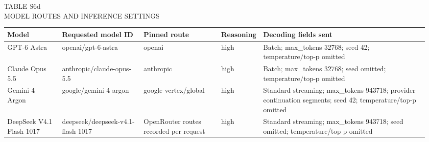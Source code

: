 \begin{table}[t]
\centering
\begingroup
\fontsize{10}{12}\selectfont
TABLE S6d\\
MODEL ROUTES AND INFERENCE SETTINGS\par\smallskip
\setlength{\tabcolsep}{4pt}
\renewcommand{\arraystretch}{1.15}
\begin{tabularx}{\linewidth}{@{}>{\hsize=0.85\hsize\raggedright\arraybackslash}X>{\hsize=1.2\hsize\raggedright\arraybackslash}X>{\hsize=0.9\hsize\raggedright\arraybackslash}X>{\hsize=0.6\hsize\raggedright\arraybackslash}X>{\hsize=1.45\hsize\raggedright\arraybackslash}X@{}}
\toprule
\textbf{Model} & \textbf{Requested model ID} & \textbf{Pinned route} & \textbf{Reasoning} & \textbf{Decoding fields sent} \\
\midrule
GPT-6 Astra & openai/gpt-6-astra & openai & high & Batch; max\_tokens 32768; seed 42; temperature/top-p omitted \\
Claude Opus 5.5 & anthropic/claude-opus-5.5 & anthropic & high & Batch; max\_tokens 32768; seed omitted; temperature/top-p omitted \\
Gemini 4 Argon & google/gemini-4-argon & google-vertex/global & high & Standard streaming; max\_tokens 943718; provider continuation segments; seed 42; temperature/top-p omitted \\
DeepSeek V4.1 Flash 1017 & deepseek/deepseek-v4.1-flash-1017 & OpenRouter routes recorded per request & high & Standard streaming; max\_tokens 943718; seed omitted; temperature/top-p omitted \\
\bottomrule
\end{tabularx}
\endgroup
\end{table}
